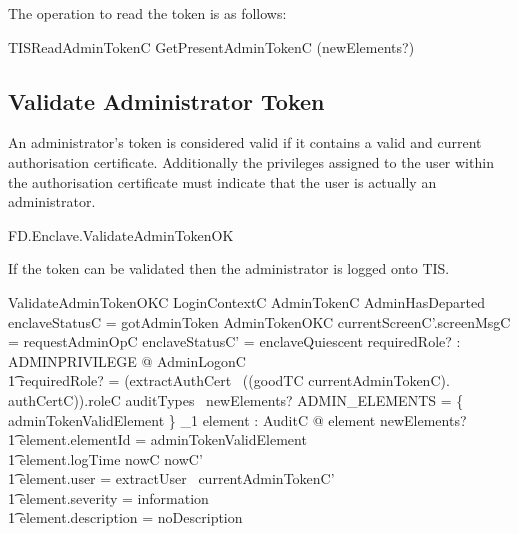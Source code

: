 The operation to read the token is as follows:

\begin{zed}
        TISReadAdminTokenC  
                GetPresentAdminTokenC \hide (newElements?)   
\end{zed}

\subsection{Validate Administrator Token}

An administrator's token is considered valid if it contains a valid
and current 
authorisation certificate. Additionally the
privileges assigned to the user within the authorisation certificate
must indicate that the user is actually an administrator.

\begin{traceunit}{FD.Enclave.ValidateAdminTokenOK}
\end{traceunit}


If the token can be validated then the administrator is logged onto
TIS.

\begin{schema}{ValidateAdminTokenOKC}
        LoginContextC
\also
        \Xi AdminTokenC
\where
        \lnot AdminHasDeparted
\\      enclaveStatusC = gotAdminToken
\also
        AdminTokenOKC
\also   
        currentScreenC'.screenMsgC = requestAdminOpC 
\also
        enclaveStatusC' = enclaveQuiescent
\also
        \exists requiredRole? : ADMINPRIVILEGE @ AdminLogonC 
\\ \t1  \land requiredRole? = (extractAuthCert~ (\The (goodTC \inv
currentAdminTokenC). authCertC)).roleC 
\also
        auditTypes~ newElements? \cap ADMIN\_ELEMENTS = 
        \{ adminTokenValidElement \} 
\also
        \exists_1 element : AuditC @ element \in newElements? 
\\ \t1  \land element.elementId = adminTokenValidElement
\\ \t1  \land element.logTime \in nowC \upto nowC'
\\ \t1  \land element.user = extractUser~ currentAdminTokenC'
\\ \t1  \land element.severity = information
\\ \t1  \land element.description = noDescription
\end{schema}

